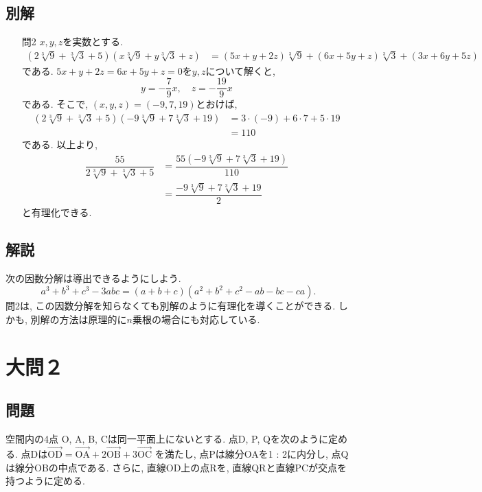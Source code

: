 \documentclass[dvipdfmx,a4paper]{jsarticle}
\newcommand{\posv}[1]{\overrightarrow{\mathrm{#1}}}
\newcommand{\2}{I\hspace{-1pt}I}
\newcommand{\3}{I\hspace{-1pt}I\hspace{-1pt}I}
\begin{document}
    \subsection{別解}
    \begin{itemize}
        \item [問2] $x,y,z$を実数とする. 
        \begin{align*}
            (2 \sqrt[3]{9} + \sqrt[3]{3} + 5)(x \sqrt[3]{9} + y\sqrt[3]{3} + z) 
            &= (5x+y+2z)\sqrt[3]{9} + (6x + 5y + z)\sqrt[3]{3} + (3x + 6y + 5z)
        \end{align*}
        である. $5x+y+2z=6x + 5y + z=0$を$y,z$について解くと, 
        \begin{equation*}
            y = -\dfrac{7}{9}x, \quad z = - \dfrac{19}{9}x
        \end{equation*}
        である. そこで, $(x,y,z)=(-9,7,19)$とおけば, 
        \begin{align*}
            (2 \sqrt[3]{9} + \sqrt[3]{3} + 5)(-9 \sqrt[3]{9} + 7\sqrt[3]{3} + 19) 
            &= 3\cdot (-9) + 6\cdot 7 + 5 \cdot 19 \\
            &= 110
        \end{align*}
        である. 以上より, 
        \begin{align*}
            \dfrac{55}{2 \sqrt[3]{9} + \sqrt[3]{3} + 5}
            &= \dfrac{55(-9 \sqrt[3]{9} + 7 \sqrt[3]{3} + 19)}{110} \\
            &= \dfrac{-9 \sqrt[3]{9} + 7 \sqrt[3]{3} + 19}{2}
        \end{align*}
        と有理化できる. 
    \end{itemize}



    \subsection{解説}
    次の因数分解は導出できるようにしよう. 
    \[
        a^3 + b^3 + c^3 -3abc = (a + b +c)(a^2 + b^2 + c^2 - ab -bc -ca).
    \]
    問2は, この因数分解を知らなくても別解のように有理化を導くことができる. しかも, 
    別解の方法は原理的に$n$乗根の場合にも対応している. 
    
    \section{大問２}
    \subsection{問題}
    空間内の4点 O, A, B, Cは同一平面上にないとする. 点D, P, Qを次のように定める. 
    点Dは$\posv{OD} = \posv{OA} + 2\posv{OB} + 3\posv{OC}$ を満たし,   
    点Pは線分OAを1 : 2に内分し, 点Qは線分OBの中点である. さらに,   
    直線OD上の点Rを, 直線QRと直線PCが交点を持つように定める.   
\end{document}

